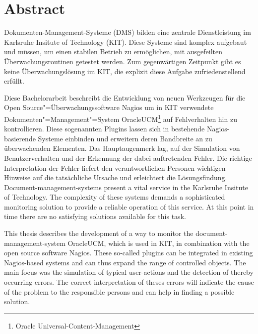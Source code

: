 \section*{Abstract}


Dokumenten-Management-Systeme (\gls{DMS}) bilden eine zentrale Dienstleistung im Karlsruhe Insitute of Technology (KIT).
Diese Systeme sind komplex aufgebaut und müssen, um einen stabilen Betrieb zu ermöglichen, mit ausgefeilten Überwachungsroutinen getestet werden.
Zum gegenwärtigen Zeitpunkt gibt es keine Überwachungslösung im KIT, die explizit diese Aufgabe zufriedenstellend erfüllt.

Diese Bachelorarbeit beschreibt die Entwicklung von neuen Werkzeugen für die Open Source"=Überwachungssoftware Nagios um in KIT verwendete Dokumenten"=Management"=System \gls{OracleUCM}\footnote{Oracle Universal-Content-Management} auf Fehlverhalten hin zu kontrollieren.
Diese sogenannten Plugins lassen sich in bestehende Nagios-basierende Systeme einbinden und erweitern deren Bandbreite an zu überwachenden Elementen.
Das Hauptaugenmerk lag, auf der Simulation von Benutzerverhalten und der Erkennung der dabei auftretenden Fehler.
Die richtige Interpretation der Fehler liefert den verantwortlichen Personen wichtigen Hinweise auf die tatsächliche Ursache und erleichtert die Lösungsfindung. \\

Document-management-systems present a vital service in the Karlsruhe Insitute of Technology.
The complexity of these systems demands a sophisticated monitoring solution to provide a reliable operation of this service.
At this point in time there are no satisfying solutions available for this task.

This thesis describes the development of a way to monitor the document-management-system \gls{OracleUCM}, which is used in KIT, in combination with the open source software Nagios.
These so-called plugins can be integrated in existing Nagios-based systems and can thus expand the range of controlled objects.
The main focus was the simulation of typical user-actions and the detection of thereby occurring errors.
The correct interpretation of theses errors will indicate  the cause of the problem to the responsible persons and can help in finding a possible solution.

